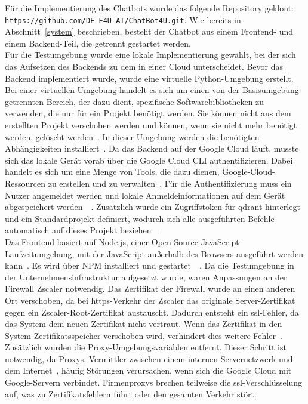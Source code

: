 Für die Implementierung des Chatbots wurde das folgende Repository geklont: \\
\texttt{https://github.com/DE-E4U-AI/ChatBot4U.git}. Wie bereits in 
Abschnitt~\ref{system} beschrieben, 
besteht der Chatbot aus einem Frontend- und einem Backend-Teil, die getrennt gestartet werden. \\
Für die Testumgebung wurde eine lokale Implementierung gewählt, bei der sich das Aufsetzen des Backends zu dem in einer Cloud unterscheidet. Bevor das Backend implementiert wurde, wurde 
eine virtuelle Python-Umgebung erstellt. Bei einer virtuellen Umgebung handelt es sich um einen von der Basisumgebung getrennten Bereich, der dazu dient, spezifische 
Softwarebibliotheken zu verwenden, die nur für ein Projekt benötigt werden. Sie können nicht aus dem erstellten Projekt verschoben werden und können, wenn sie nicht 
mehr benötigt werden, gelöscht werden~\cite{an1}. In dieser Umgebung werden die benötigten Abhängigkeiten installiert~\cite{an2}. Da das Backend auf der Google Cloud 
läuft, musste sich das lokale Gerät vorab über die Google Cloud CLI authentifizieren. Dabei handelt es sich um eine Menge von Tools, die dazu dienen, Google-Cloud-Ressourcen
zu erstellen und zu verwalten~\cite{an30}. Für die Authentifizierung muss ein Nutzer angemeldet werden und lokale Anmeldeinformationen auf dem Gerät abgespeichert
werden~\cite{an4}~\cite{an6}. Zusätzlich wurde ein Zugriffstoken für \gls{qdrant} hinterlegt und ein Standardprojekt definiert, wodurch sich alle ausgeführten Befehle 
automatisch auf dieses Projekt beziehen~\cite{an6}~\cite{an7}. \\
Das Frontend basiert auf Node.js, einer Open-Source-JavaScript-Laufzeitumgebung, mit der JavaScript außerhalb des Browsers ausgeführt werden kann~\cite{an31}. Es wird
über NPM installiert und gestartet~\cite{an10}~\cite{an12}. Da die Testumgebung in der Unternehmensinfrastruktur aufgesetzt wurde, waren Anpassungen an der Firewall
Zscaler notwendig. Das Zertifikat der Firewall wurde an einen anderen Ort verschoben, da bei \ac{https}-Verkehr der Zscaler das originale Server-Zertifikat gegen ein 
Zscaler-Root-Zertifikat austauscht. Dadurch entsteht ein \ac{ssl}-Fehler, da das System dem neuen Zertifikat nicht vertraut. Wenn das Zertifikat in den 
System-Zertifikatsspeicher verschoben wird, verhindert dies weitere Fehler~\cite{an11}. Zusätzlich wurden die Proxy-Umgebungsvariablen entfernt.
Dieser Schritt ist notwendig, da Proxys, Vermittler zwischen einem internen Servernetzwerk und dem Internet~\cite{an9}, häufig Störungen verursachen, wenn sich die 
Google Cloud mit Google-Servern verbindet. Firmenproxys brechen teilweise die \ac{ssl}-Verschlüsselung auf, was zu Zertifikatsfehlern führt oder den gesamten Verkehr 
stört. \\

